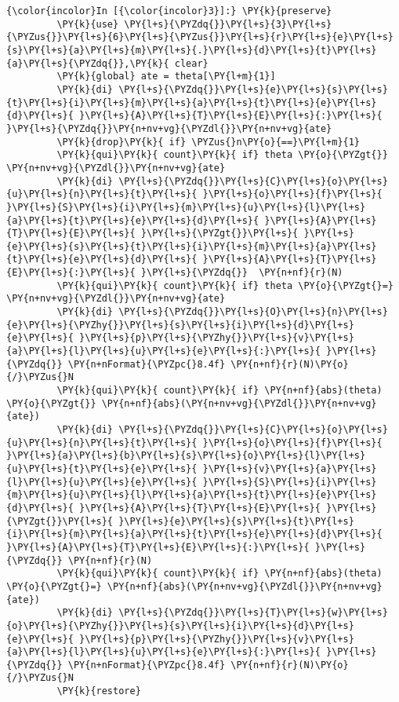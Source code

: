 \documentclass[11pt,notitlepage]{article}\usepackage[]{graphicx}\usepackage[]{color}
\makeatletter
\newenvironment{kframe}{%
 \def\at@end@of@kframe{}%
 \ifinner\ifhmode%
  \def\at@end@of@kframe{\end{minipage}}%
  \begin{minipage}{\columnwidth}%
 \fi\fi%
 \def\FrameCommand##1{\hskip\@totalleftmargin \hskip-\fboxsep
 \colorbox{shadecolor}{##1}\hskip-\fboxsep
     \hskip-\linewidth \hskip-\@totalleftmargin \hskip\columnwidth}%
 \MakeFramed {\advance\hsize-\width
   \@totalleftmargin\z@ \linewidth\hsize
   \@setminipage}}%
 {\par\unskip\endMakeFramed%
 \at@end@of@kframe}
\newenvironment{knitrout}{}{} %
\makeatother
\begin{document}
\begin{knitrout}
\begin{kframe}
    \begin{Verbatim}[commandchars=\\\{\}]
{\color{incolor}In [{\color{incolor}3}]:} \PY{k}{preserve} 
         \PY{k}{use} \PY{l+s}{\PYZdq{}}\PY{l+s}{3}\PY{l+s}{\PYZus{}}\PY{l+s}{6}\PY{l+s}{\PYZus{}}\PY{l+s}{r}\PY{l+s}{e}\PY{l+s}{s}\PY{l+s}{a}\PY{l+s}{m}\PY{l+s}{.}\PY{l+s}{d}\PY{l+s}{t}\PY{l+s}{a}\PY{l+s}{\PYZdq{}},\PY{k}{ clear}
         \PY{k}{global} ate = theta[\PY{l+m}{1}]
         \PY{k}{di} \PY{l+s}{\PYZdq{}}\PY{l+s}{e}\PY{l+s}{s}\PY{l+s}{t}\PY{l+s}{i}\PY{l+s}{m}\PY{l+s}{a}\PY{l+s}{t}\PY{l+s}{e}\PY{l+s}{d}\PY{l+s}{ }\PY{l+s}{A}\PY{l+s}{T}\PY{l+s}{E}\PY{l+s}{:}\PY{l+s}{ }\PY{l+s}{\PYZdq{}}\PY{n+nv+vg}{\PYZdl{}}\PY{n+nv+vg}{ate}
         \PY{k}{drop}\PY{k}{ if} \PYZus{}n\PY{o}{==}\PY{l+m}{1}
         \PY{k}{qui}\PY{k}{ count}\PY{k}{ if} theta \PY{o}{\PYZgt{}} \PY{n+nv+vg}{\PYZdl{}}\PY{n+nv+vg}{ate}
         \PY{k}{di} \PY{l+s}{\PYZdq{}}\PY{l+s}{C}\PY{l+s}{o}\PY{l+s}{u}\PY{l+s}{n}\PY{l+s}{t}\PY{l+s}{ }\PY{l+s}{o}\PY{l+s}{f}\PY{l+s}{ }\PY{l+s}{S}\PY{l+s}{i}\PY{l+s}{m}\PY{l+s}{u}\PY{l+s}{l}\PY{l+s}{a}\PY{l+s}{t}\PY{l+s}{e}\PY{l+s}{d}\PY{l+s}{ }\PY{l+s}{A}\PY{l+s}{T}\PY{l+s}{E}\PY{l+s}{ }\PY{l+s}{\PYZgt{}}\PY{l+s}{ }\PY{l+s}{e}\PY{l+s}{s}\PY{l+s}{t}\PY{l+s}{i}\PY{l+s}{m}\PY{l+s}{a}\PY{l+s}{t}\PY{l+s}{e}\PY{l+s}{d}\PY{l+s}{ }\PY{l+s}{A}\PY{l+s}{T}\PY{l+s}{E}\PY{l+s}{:}\PY{l+s}{ }\PY{l+s}{\PYZdq{}}  \PY{n+nf}{r}(N)
         \PY{k}{qui}\PY{k}{ count}\PY{k}{ if} theta \PY{o}{\PYZgt{}=} \PY{n+nv+vg}{\PYZdl{}}\PY{n+nv+vg}{ate}
         \PY{k}{di} \PY{l+s}{\PYZdq{}}\PY{l+s}{O}\PY{l+s}{n}\PY{l+s}{e}\PY{l+s}{\PYZhy{}}\PY{l+s}{s}\PY{l+s}{i}\PY{l+s}{d}\PY{l+s}{e}\PY{l+s}{ }\PY{l+s}{p}\PY{l+s}{\PYZhy{}}\PY{l+s}{v}\PY{l+s}{a}\PY{l+s}{l}\PY{l+s}{u}\PY{l+s}{e}\PY{l+s}{:}\PY{l+s}{ }\PY{l+s}{\PYZdq{}} \PY{n+nFormat}{\PYZpc{}8.4f} \PY{n+nf}{r}(N)\PY{o}{/}\PYZus{}N
         \PY{k}{qui}\PY{k}{ count}\PY{k}{ if} \PY{n+nf}{abs}(theta) \PY{o}{\PYZgt{}} \PY{n+nf}{abs}(\PY{n+nv+vg}{\PYZdl{}}\PY{n+nv+vg}{ate})
         \PY{k}{di} \PY{l+s}{\PYZdq{}}\PY{l+s}{C}\PY{l+s}{o}\PY{l+s}{u}\PY{l+s}{n}\PY{l+s}{t}\PY{l+s}{ }\PY{l+s}{o}\PY{l+s}{f}\PY{l+s}{ }\PY{l+s}{a}\PY{l+s}{b}\PY{l+s}{s}\PY{l+s}{o}\PY{l+s}{l}\PY{l+s}{u}\PY{l+s}{t}\PY{l+s}{e}\PY{l+s}{ }\PY{l+s}{v}\PY{l+s}{a}\PY{l+s}{l}\PY{l+s}{u}\PY{l+s}{e}\PY{l+s}{ }\PY{l+s}{S}\PY{l+s}{i}\PY{l+s}{m}\PY{l+s}{u}\PY{l+s}{l}\PY{l+s}{a}\PY{l+s}{t}\PY{l+s}{e}\PY{l+s}{d}\PY{l+s}{ }\PY{l+s}{A}\PY{l+s}{T}\PY{l+s}{E}\PY{l+s}{ }\PY{l+s}{\PYZgt{}}\PY{l+s}{ }\PY{l+s}{e}\PY{l+s}{s}\PY{l+s}{t}\PY{l+s}{i}\PY{l+s}{m}\PY{l+s}{a}\PY{l+s}{t}\PY{l+s}{e}\PY{l+s}{d}\PY{l+s}{ }\PY{l+s}{A}\PY{l+s}{T}\PY{l+s}{E}\PY{l+s}{:}\PY{l+s}{ }\PY{l+s}{\PYZdq{}} \PY{n+nf}{r}(N)
         \PY{k}{qui}\PY{k}{ count}\PY{k}{ if} \PY{n+nf}{abs}(theta) \PY{o}{\PYZgt{}=} \PY{n+nf}{abs}(\PY{n+nv+vg}{\PYZdl{}}\PY{n+nv+vg}{ate})
         \PY{k}{di} \PY{l+s}{\PYZdq{}}\PY{l+s}{T}\PY{l+s}{w}\PY{l+s}{o}\PY{l+s}{\PYZhy{}}\PY{l+s}{s}\PY{l+s}{i}\PY{l+s}{d}\PY{l+s}{e}\PY{l+s}{ }\PY{l+s}{p}\PY{l+s}{\PYZhy{}}\PY{l+s}{v}\PY{l+s}{a}\PY{l+s}{l}\PY{l+s}{u}\PY{l+s}{e}\PY{l+s}{:}\PY{l+s}{ }\PY{l+s}{\PYZdq{}} \PY{n+nFormat}{\PYZpc{}8.4f} \PY{n+nf}{r}(N)\PY{o}{/}\PYZus{}N
         \PY{k}{restore}
\end{Verbatim}


\end{kframe}
\end{knitrout}
\end{document}
